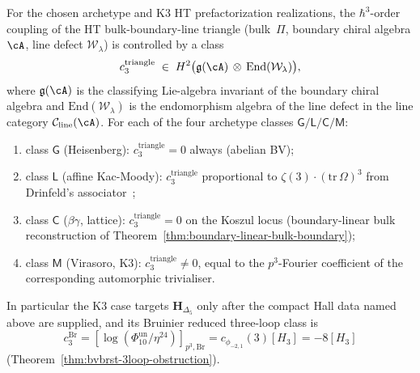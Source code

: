 \begin{theorem}
\label{thm:htbb-3loop-triangle-general}
For the chosen archetype and K3 HT prefactorization realizations, the
$\hbar^3$-order coupling of the HT bulk-boundary-line triangle
(bulk~$\Pi$, boundary chiral algebra $\cA$, line defect
$\mathcal{W}_\lambda$) is controlled by a class
\[
 c_3^{\mathrm{triangle}}
 \;\in\;
 H^2\bigl(\mathfrak{g}(\cA)\,\otimes\,\mathrm{End}(\mathcal{W}_\lambda)\bigr),
\]
where $\mathfrak{g}(\cA)$ is the classifying Lie-algebra invariant of the
boundary chiral algebra and $\mathrm{End}(\mathcal{W}_\lambda)$ is the
endomorphism algebra of the line defect in the line category
$\mathcal{C}_{\mathrm{line}}(\cA)$. For each of the four archetype
classes $\mathsf{G}/\mathsf{L}/\mathsf{C}/\mathsf{M}$:
\begin{enumerate}[leftmargin=1.8em,label=\textup{(\alph*)}]
\item class $\mathsf{G}$ (Heisenberg): $c_3^{\mathrm{triangle}} = 0$
 always (abelian BV);
\item class $\mathsf{L}$ (affine Kac-Moody): $c_3^{\mathrm{triangle}}$
 proportional to $\zeta(3)\cdot(\mathrm{tr}\,\Omega)^3$ from Drinfeld's
 associator~\cite{Drinfeld1991};
\item class $\mathsf{C}$ ($\beta\gamma$, lattice): $c_3^{\mathrm{triangle}} = 0$
 on the Koszul locus (boundary-linear bulk reconstruction of
 Theorem~\ref{thm:boundary-linear-bulk-boundary});
\item class $\mathsf{M}$ (Virasoro, K3): $c_3^{\mathrm{triangle}} \neq 0$,
 equal to the $p^3$-Fourier coefficient of the corresponding
 automorphic trivialiser.
\end{enumerate}
In particular the K3 case targets $\mathbf{H}_{\Delta_5}$ only after
the compact Hall data named above are supplied, and its Bruinier
reduced three-loop class is
\[
 c^{\mathrm{Br}}_3
 =[\log(\Phi_{10}^{\mathrm{un}}/\eta^{24})]_{p^3,\mathrm{Br}}
 =c_{\phi_{-2,1}}(3)[H_3]
 =-8[H_3]
\]
(Theorem~\ref{thm:bvbrst-3loop-obstruction}).
\end{theorem}

